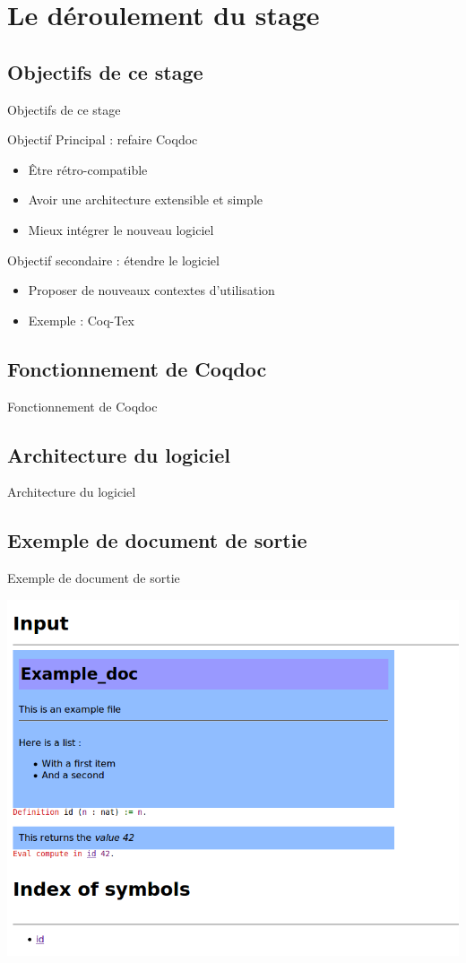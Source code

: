 \documentclass[compress]{beamer}
\newenvironment{tframe}[1]{
  \subsection{#1}
  \begin{frame}{#1}
  }{
  \end{frame}
  }
\begin{document}
\section{Le déroulement du stage}

\begin{tframe}{Objectifs de ce stage}
  \begin{block}{Objectif Principal : refaire Coqdoc}
    \begin{itemize}
      \item Être rétro-compatible
      \item Avoir une architecture extensible et simple
      \item Mieux intégrer le nouveau logiciel
    \end{itemize}
  \end{block}
  \begin{block}{Objectif secondaire : étendre le logiciel}
    \begin{itemize}
      \item Proposer de nouveaux contextes d'utilisation
      \item Exemple : Coq-Tex
    \end{itemize}
  \end{block}
\end{tframe}

\begin{tframe}{Fonctionnement de Coqdoc}
  \begin{figure}
    
  \end{figure}
\end{tframe}

\begin{tframe}{Architecture du logiciel}
  \begin{figure}
    
  \end{figure}
\end{tframe}

\begin{tframe}{Exemple de document de sortie}
\begin{center}
\includegraphics[scale=0.4]{input.png}
\end{center}
\end{tframe}
\end{document}
